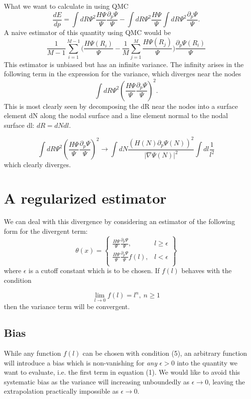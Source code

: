 \documentclass{article}
\begin{document}
What we want to calculate in using QMC
\begin{equation}
\frac{dE}{dp} = \int dR \Psi^2 \frac{H\Psi}{\Psi} \frac{\partial_p \Psi}{\Psi}  - \int dR \Psi^2 \frac{H\Psi}{\Psi} \int dR \Psi^2 \frac{\partial_p \Psi}{\Psi}.
\end{equation}
A naive estimator of this quantity using QMC would be 
\begin{equation}
\frac{1}{M-1}\sum_{i=1}^{M-1} \Bigg(\frac{H\Psi(R_i)}{\Psi} - \frac{1}{M} \sum_{j=1}^{M} \frac{H\Psi(R_j)}{\Psi}\Bigg)\frac{\partial_p \Psi(R_i)}{\Psi}
\end{equation}
This estimator is unbiased but has an infinite variance. The infinity arises in the following term in the expression for the variance, which diverges near the nodes
$$ 
\int dR \Psi^2 (\frac{H\Psi}{\Psi} \frac{\partial_p \Psi}{\Psi})^2.
$$
This is most clearly seen by decomposing the dR near the nodes into a surface element dN along the nodal surface and a line element normal to the nodal surface dl: $dR = dN dl$.

\begin{equation}
\int dR \Psi^2 (\frac{H\Psi}{\Psi}\frac{\partial_p \Psi}{\Psi})^2 \rightarrow \int dN \frac{(H(N) \partial_p \Psi(N))^2}{|\nabla\Psi(N)|^2} \int dl \frac{1}{l^2} 
\end{equation}
which clearly diverges.

\section{A regularized estimator} 
We can deal with this divergence by considering an estimator of the following form for the divergent term:
\begin{equation}
  \theta(x) = \left.
  \begin{cases}
    \frac{H\Psi}{\Psi} \frac{\partial_p \Psi}{\Psi}, & l \geq \epsilon \\
    \frac{H\Psi}{\Psi} \frac{\partial_p \Psi}{\Psi} f(l), & l < \epsilon \\
  \end{cases}
  \right\}
\end{equation}
where $\epsilon$ is a cutoff constant which is to be chosen. If $f(l)$ behaves with the condition 

\begin{equation}
\lim_{l\rightarrow 0} f(l) = l^n, \ n \geq 1 
\end{equation}
then the variance term will be convergent. 

\subsection{Bias}
While any function $f(l)$ can be chosen with condition (5), an arbitrary function will introduce a bias which is non-vanishing for \textit{any} $\epsilon  > 0$ into the quantity we want to evaluate, i.e. the first term in equation (1). 
We would like to avoid this systematic bias as the variance will increasing unboundedly as $\epsilon \rightarrow 0$, leaving the extrapolation practically impossible as $\epsilon \rightarrow 0$.
\end{document}
